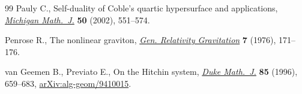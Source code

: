 \documentclass[10pt,a4paper]{amsart}
\numberwithin{equation}{section}
\begin{document}
\begin{thebibliography}{99}
Pauly C., Self-duality of {C}oble's quartic hypersurface and applications,
 \href{https://doi.org/10.1307/mmj/1039029982}{\textit{Michigan Math.~J.}} \textbf{50} (2002), 551--574.

Penrose R., The nonlinear graviton, \href{https://doi.org/10.1007/bf00763433}{\textit{Gen. Relativity Gravitation}}
 \textbf{7} (1976), 171--176.

van Geemen B., Previato E., On the {H}itchin system, \href{https://doi.org/10.1215/S0012-7094-96-08525-7}{\textit{Duke Math.~J.}}
 \textbf{85} (1996), 659--683, \href{https://arxiv.org/abs/alg-geom/9410015}{arXiv:alg-geom/9410015}.

\end{thebibliography}
\end{document}
